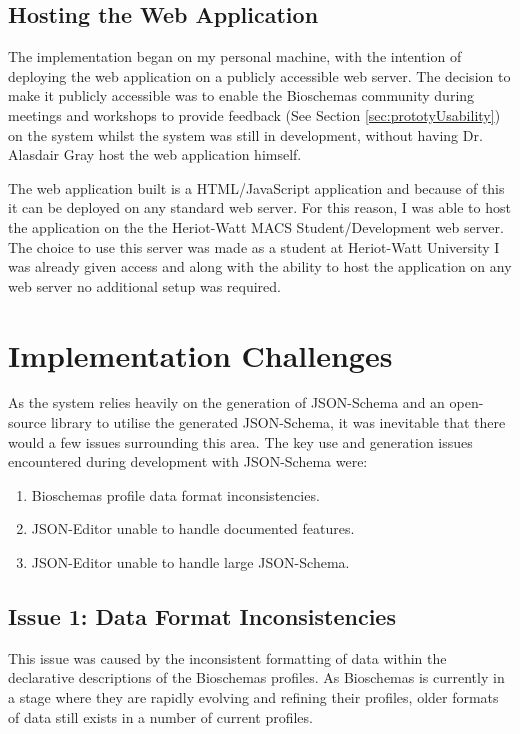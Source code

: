 \subsection{Hosting the Web Application}
The implementation began on my personal machine, with the intention of deploying the web application on a publicly accessible web server. The decision to make it publicly accessible was to enable the Bioschemas community during meetings and workshops to provide feedback (See Section \ref{sec:prototyUsability}) on the system whilst the system was still in development, without having Dr. Alasdair Gray host the web application himself.

The web application built is a HTML/JavaScript application and because of this it can be deployed on any standard web server. For this reason, I was able to host the application on the the Heriot-Watt MACS Student/Development web server. The choice to use this server was made as a student at Heriot-Watt University I was already given access and along with the ability to host the application on any web server no additional setup was required. 


\section{Implementation Challenges}\label{sec:issues}
As the system relies heavily on the generation of JSON-Schema and an open-source library to utilise the generated JSON-Schema, it was inevitable that there would a few issues surrounding this area. The key use and generation issues encountered during development with JSON-Schema were:

\begin{enumerate}
  \item Bioschemas profile data format inconsistencies.
   \item JSON-Editor unable to handle documented features.
  \item JSON-Editor unable to handle large JSON-Schema.
\end{enumerate}


\subsection{Issue 1: Data Format Inconsistencies}
This issue was caused by the inconsistent formatting of data within the declarative descriptions of the Bioschemas profiles. As Bioschemas is currently in a stage where they are rapidly evolving and refining their profiles, older formats of data still exists in a number of current profiles. 

